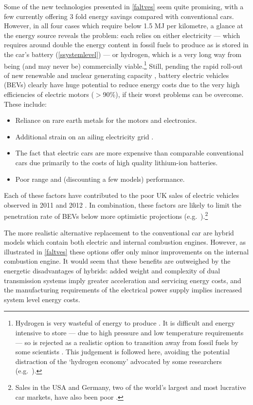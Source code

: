 \documentclass[a4paper, 11pt, twoside]{Thesis}
\begin{document}
Some of the new technologies presented in \cref{faltves} seem quite promising,
with a few currently offering 3 fold energy savings compared with conventional
cars. However, in all four cases which require below 1.5 MJ per kilometre, a
glance at the energy source reveals the problem: each relies on either
electricity --- which requires around double
the energy content in fossil fuels to produce as is stored in the car's
battery (\cref{ssystemlevel})
--- or hydrogen, which is a very long way from being (and may never be)
commercially viable.\footnote{Hydrogen
is very wasteful of energy to produce \citep{Smil2008}. It
is difficult and energy intensive to store --- due to high pressure and low temperature
requirements --- so is rejected as a realistic option to transition away from
fossil fuels by some scientists \citep{MacKay2009, kreith2004fallacies}.
This judgement is followed here, avoiding the potential distraction of the
`hydrogen economy' advocated by some researchers (e.g.~\citealp{Kleijn2010}).
}
Still, pending the rapid roll-out of new renewable and nuclear generating
capacity \citep{dyke2010impact},
battery electric vehicles (BEVs) clearly have huge
potential to reduce energy costs due to the very high efficiencies of
electric motors ($>$90\%), if their worst problems can be overcome.
These include:
\begin{itemize}
 \item Reliance on rare earth metals for the motors and electronics.
 \item Additional strain on an ailing electricity grid \citep{dyke2010impact,
 webster1999can}.
 \item The fact that electric cars are
more expensive than comparable conventional cars due primarily to the costs of
high quality lithium-ion batteries.
\item Poor range and (discounting a few models) performance.
\end{itemize}
Each of these factors have contributed to
the poor UK sales of electric vehicles observed in 2011
\citep{AdamVaughan2011} and 2012 \citep{DavidCornis, Massey2013elecmail}.
In combination, these factors are likely to limit the penetration rate of BEVs below
more optimistic projections (e.g.~\citealp{Shepherd2012}).\footnote{Sales
in the USA and Germany, two of the world's largest and most lucrative car
markets, have also been poor \citep{Hepker, Mihalascu}.}

The more realistic alternative replacement to the conventional car are hybrid
models which contain both electric and internal combustion engines. However,
as illustrated in \cref{faltves} these options offer only minor improvements
on the internal combustion engine. It would seem that these benefits are
outweighed by the energetic disadvantages of hybrids:
added weight and complexity of dual transmission systems imply greater
acceleration and servicing energy costs, and
the manufacturing requirements of  the electrical
power supply implies increased system level energy costs.
\end{document}
